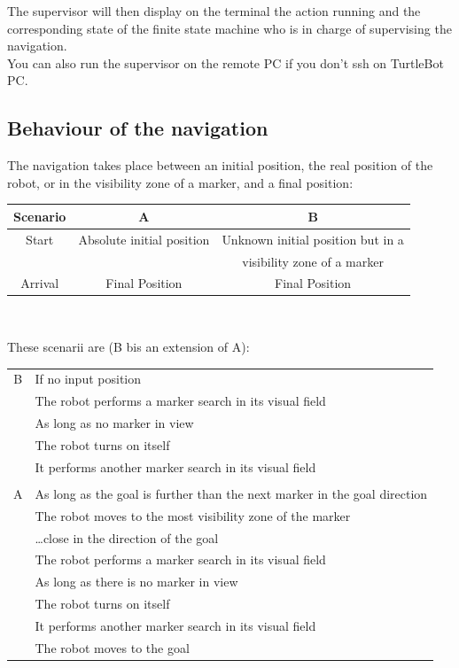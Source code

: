 \documentclass[10pt,a4paper]{article}
\begin{document}
The supervisor will then display on the terminal the action running and the corresponding state of the finite state machine who is in charge of supervising the navigation.\\

You can also run the supervisor on the remote PC if you don't ssh on TurtleBot PC.



\subsection{Behaviour of the navigation}
\label{sec:behaviourOfTheNavigation}

The navigation takes place between an initial position, the real position of the robot, or in the visibility zone of a marker, and a final position:

\begin{center}
\begin{tabular} {c | c | c}
Scenario & A & B \\\hline
Start & Absolute initial position & Unknown initial position but in a \\
 & & visibility zone of a marker \\\hline
 Arrival & Final Position & Final Position
\end{tabular} \\
\end{center}

\noindent These scenarii are (B bis an extension of A): \\

\begin{tabular} {cl}
B & If no input position \\
  & \indent The robot performs a marker search in its visual field \\
  & \indent As long as no marker in view \\
  & \indent \indent The robot turns on itself \\
  & \indent \indent It performs another marker search in its visual field \\
& \\
A & As long as the goal is further than the next marker in the goal direction \\
  & \indent The robot moves to the most visibility zone of the marker \\
  & \indent \ldots close in the direction of the goal \\
  & \indent The robot performs a marker search in its visual field \\
  & \indent As long as there is no marker in view \\
  & \indent \indent The robot turns on itself \\
  & \indent \indent It performs another marker search in its visual field \\
  & \indent The robot moves to the goal \\
\end{tabular}
\end{document}
